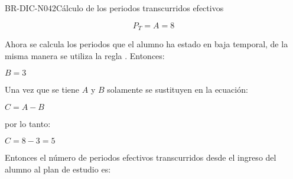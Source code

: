 \begin{BusinessRule}{BR-DIC-N042}{Cálculo de los periodos transcurridos efectivos}
\begin{center}
		\[P_{T} = A = 8\] 
	\end{center}
	Ahora se calcula los periodos que el alumno ha estado en baja temporal, de la misma manera se utiliza la regla . 
	Entonces: \\
	\begin{center}
		$B = 3$
	\end{center}
	Una vez que se tiene $A$ y $B$ solamente se sustituyen en la ecuación:
	\begin{center}
		$C = A - B$
	\end{center} 
	por lo tanto: 
	\begin{center}
		$C = 8 - 3 = 5$
	\end{center} 
	Entonces el número de periodos efectivos transcurridos desde el ingreso del alumno al plan de estudio es: 
\end{BusinessRule}

